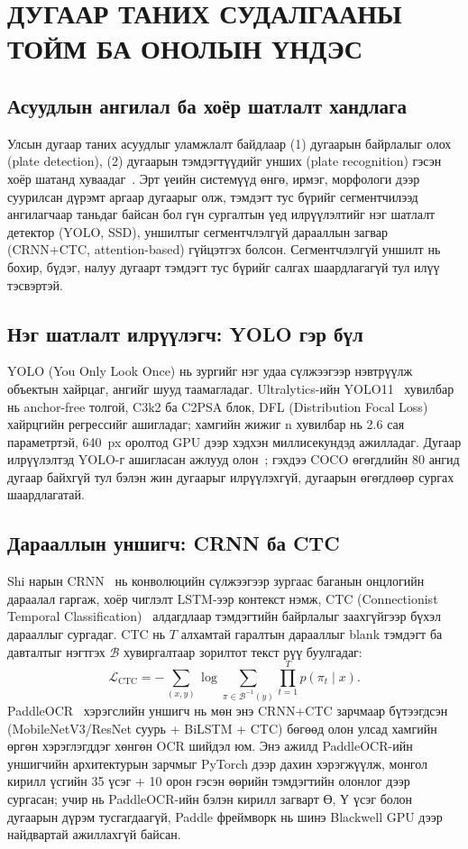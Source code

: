 \chapter{ДУГААР ТАНИХ СУДАЛГААНЫ ТОЙМ БА ОНОЛЫН ҮНДЭС}
\section{Асуудлын ангилал ба хоёр шатлалт хандлага}
Улсын дугаар таних асуудлыг уламжлалт байдлаар (1) дугаарын байрлалыг олох (plate detection), (2) дугаарын тэмдэгтүүдийг унших (plate recognition) гэсэн хоёр шатанд хуваадаг~\cite{laroca2018}. Эрт үеийн системүүд өнгө, ирмэг, морфологи дээр суурилсан дүрэмт аргаар дугаарыг олж, тэмдэгт тус бүрийг сегментчилээд ангилагчаар таньдаг байсан бол гүн сургалтын үед илрүүлэлтийг нэг шатлалт детектор (YOLO, SSD), уншилтыг сегментчлэлгүй дарааллын загвар (CRNN+CTC, attention-based) гүйцэтгэх болсон. Сегментчлэлгүй уншилт нь бохир, бүдэг, налуу дугаарт тэмдэгт тус бүрийг салгах шаардлагагүй тул илүү тэсвэртэй.

\section{Нэг шатлалт илрүүлэгч: YOLO гэр бүл}
YOLO (You Only Look Once) нь зургийг нэг удаа сүлжээгээр нэвтрүүлж объектын хайрцаг, ангийг шууд таамагладаг. Ultralytics-ийн YOLO11~\cite{yolo11} хувилбар нь anchor-free толгой, C3k2 ба C2PSA блок, DFL (Distribution Focal Loss) хайрцгийн регрессийг ашигладаг; хамгийн жижиг n хувилбар нь 2.6 сая параметртэй, 640~px оролтод GPU дээр хэдхэн миллисекундэд ажилладаг. Дугаар илрүүлэлтэд YOLO-г ашигласан ажлууд олон~\cite{laroca2018,morse2025}; гэхдээ COCO өгөгдлийн 80 ангид дугаар байхгүй тул бэлэн жин дугаарыг илрүүлэхгүй, дугаарын өгөгдлөөр сургах шаардлагатай.

\section{Дарааллын уншигч: CRNN ба CTC}
Shi нарын CRNN~\cite{shi2017crnn} нь конволюцийн сүлжээгээр зургаас баганын онцлогийн дараалал гаргаж, хоёр чиглэлт LSTM-ээр контекст нэмж, CTC (Connectionist Temporal Classification)~\cite{graves2006ctc} алдагдлаар тэмдэгтийн байрлалыг заахгүйгээр бүхэл дарааллыг сургадаг. CTC нь $T$ алхамтай гаралтын дарааллыг blank тэмдэгт ба давталтыг нэгтгэх $\mathcal{B}$ хувиргалтаар зорилтот текст рүү буулгадаг:
\begin{equation}
\mathcal{L}_{\mathrm{CTC}} = -\sum_{(x,y)}\log\sum_{\pi\in\mathcal{B}^{-1}(y)}\prod_{t=1}^{T}p(\pi_t\mid x).
\end{equation}
PaddleOCR~\cite{ppocr} хэрэгслийн уншигч нь мөн энэ CRNN+CTC зарчмаар бүтээгдсэн (MobileNetV3/ResNet суурь + BiLSTM + CTC) бөгөөд олон улсад хамгийн өргөн хэрэглэгддэг хөнгөн OCR шийдэл юм. Энэ ажилд PaddleOCR-ийн уншигчийн архитектурын зарчмыг PyTorch дээр дахин хэрэгжүүлж, монгол кирилл үсгийн 35 үсэг + 10 орон гэсэн өөрийн тэмдэгтийн олонлог дээр сургасан; учир нь PaddleOCR-ийн бэлэн кирилл загварт Ө, Ү үсэг болон дугаарын дүрэм тусгагдаагүй, Paddle фреймворк нь шинэ Blackwell GPU дээр найдвартай ажиллахгүй байсан.


